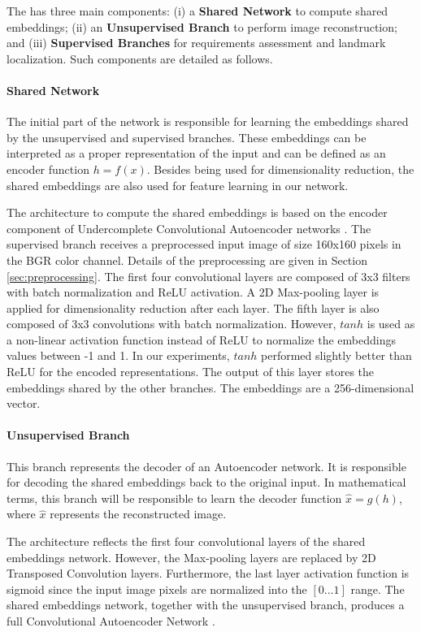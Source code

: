 The \methodname has three main components: (i) a \textbf{Shared Network} to compute shared embeddings; (ii) an \textbf{Unsupervised Branch} to perform image reconstruction; and (iii) \textbf{Supervised Branches} for requirements assessment and landmark localization. Such components are detailed as follows.

\paragraph{Shared Network}

The initial part of the network is responsible for learning the embeddings shared by the unsupervised and supervised branches. These embeddings can be interpreted as a proper representation of the input and can be defined as an encoder function $h = f(x)$. Besides being used for dimensionality reduction, the shared embeddings are also used for feature learning in our network.

The architecture to compute the shared embeddings is based on the encoder component of Undercomplete Convolutional Autoencoder networks \citep[p.~500]{goodfellow2016deep}. The supervised branch receives a preprocessed input image of size 160x160 pixels in the BGR color channel. Details of the preprocessing are given in Section \ref{sec:preprocessing}. The first four convolutional layers are composed of 3x3 filters with batch normalization and ReLU activation. A 2D Max-pooling layer is applied for dimensionality reduction after each layer. The fifth layer is also composed of 3x3 convolutions with batch normalization. However, $tanh$ is used as a non-linear activation function instead of ReLU to normalize the embeddings values between -1 and 1. In our experiments, $tanh$ performed slightly better than ReLU for the encoded representations. The output of this layer stores the embeddings shared by the other branches. The embeddings are a 256-dimensional vector.

\paragraph{Unsupervised Branch}

This branch represents the decoder of an Autoencoder network. It is responsible for decoding the shared embeddings back to the original input. In mathematical terms, this branch will be responsible to learn the decoder function $\hat{x} = g(h)$, where $\hat{x}$ represents the reconstructed image. 

The architecture reflects the first four convolutional layers of the shared embeddings network. However, the Max-pooling layers are replaced by 2D Transposed Convolution layers. Furthermore, the last layer activation function is sigmoid since the input image pixels are normalized into the $[0...1]$ range. The shared embeddings network, together with the unsupervised branch, produces a full Convolutional Autoencoder Network \citep{goodfellow2016deep}.

